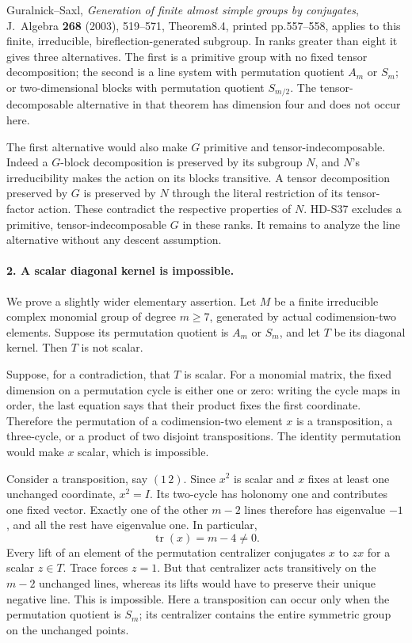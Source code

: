 Guralnick--Saxl, \emph{Generation of finite almost simple groups
by conjugates}, J.~Algebra \textbf{268} (2003), 519--571,
Theorem8.4, printed pp.557--558, applies to this finite,
irreducible, bireflection-generated subgroup. In ranks greater
than eight it gives three alternatives. The first is a primitive
group with no fixed tensor decomposition; the second is a line
system with permutation quotient \(A_m\) or
\(S_m\); or two-dimensional blocks with permutation quotient
\(S_{m/2}\). The tensor-decomposable alternative in that
theorem has dimension four and does not occur here.

The first alternative would also make \(G\) primitive and
tensor-indecomposable. Indeed a \(G\)-block decomposition is
preserved by its subgroup \(N\), and \(N\)'s irreducibility
makes the action on its blocks transitive. A tensor decomposition
preserved by \(G\) is preserved by \(N\) through the literal
restriction of its tensor-factor action. These contradict the
respective properties of \(N\). HD-S37 excludes a primitive,
tensor-indecomposable \(G\) in these ranks. It remains to
analyze the line alternative without any descent assumption.

\paragraph{2. A scalar diagonal kernel is impossible.}
We prove a slightly wider elementary assertion. Let \(M\)
be a finite irreducible complex monomial group of degree
\(m\ge7\), generated by actual codimension-two elements.
Suppose its permutation quotient is \(A_m\) or \(S_m\),
and let \(T\) be its diagonal kernel. Then \(T\) is not
scalar.

Suppose, for a contradiction, that \(T\) is scalar.
For a monomial matrix, the fixed dimension on a permutation
cycle is either one or zero: writing the cycle maps in order,
the last equation says that their product fixes the first
coordinate. Therefore the permutation of a codimension-two
element \(x\) is a transposition, a three-cycle, or a product
of two disjoint transpositions. The identity permutation would
make \(x\) scalar, which is impossible.

Consider a transposition, say \((1\,2)\). Since \(x^2\)
is scalar and \(x\) fixes at least one unchanged coordinate,
\(x^2=I\). Its two-cycle has holonomy one and contributes
one fixed vector. Exactly one of the other \(m-2\) lines
therefore has eigenvalue \(-1\), and all the rest have
eigenvalue one. In particular,
\[
                         \operatorname{tr}(x)=m-4\ne0.      \tag{S40.4}
\]
Every lift of an element of the permutation centralizer conjugates
\(x\) to \(z x\) for a scalar \(z\in T\). Trace forces
\(z=1\). But that centralizer acts transitively on the
\(m-2\) unchanged lines, whereas its lifts would have to
preserve their unique negative line. This is impossible.
Here a transposition can occur only when the permutation quotient
is \(S_m\); its centralizer contains the entire symmetric
group on the unchanged points.

